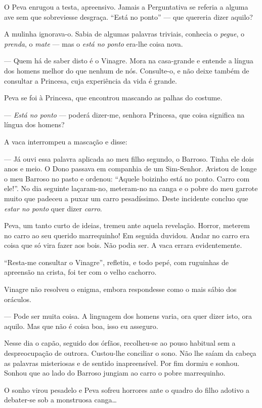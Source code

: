 O Peva enrugou a testa, apreensivo. Jamais a Perguntativa se referia a
alguma ave sem que sobreviesse desgraça. ``Está no ponto'' --- que
quereria dizer aquilo?

A mulinha ignorava-o. Sabia de algumas palavras triviais, conhecia o
\emph{pegue}, o \emph{prenda}, o \emph{mate} --- mas o \emph{está no
ponto} era-lhe coisa nova.

--- Quem há de saber disto é o Vinagre. Mora na casa-grande e entende a
língua dos homens melhor do que nenhum de nós. Consulte-o, e não deixe
também de consultar a Princesa, cuja experiência da vida é grande.

Peva se foi à Princesa, que encontrou mascando as palhas do costume.

--- \emph{Está no ponto} --- poderá dizer-me, senhora Princesa, que
coisa significa na língua dos homens?

A vaca interrompeu a mascação e disse:

--- Já ouvi essa palavra aplicada ao meu filho segundo, o Barroso. Tinha
ele dois anos e meio. O Dono passava em companhia de um Sim-Senhor.
Avistou de longe o meu Barroso no pasto e ordenou: ``Aquele boizinho
está no ponto. Carro com ele!''. No dia seguinte laçaram-no, meteram-no
na canga e o pobre do meu garrote muito que padeceu a puxar um carro
pesadíssimo. Deste incidente concluo que \emph{estar no ponto} quer
dizer \emph{carro}.

Peva, um tanto curto de ideias, tremeu ante aquela revelação. Horror,
meterem no carro ao seu querido marrequinho! Em seguida duvidou. Andar
no carro era coisa que só vira fazer aos bois. Não podia ser. A vaca
errara evidentemente.

``Resta-me consultar o Vinagre'', refletiu, e todo pepé, com ruguinhas
de apreensão na crista, foi ter com o velho cachorro.

Vinagre não resolveu o enigma, embora respondesse como o mais sábio dos
oráculos.

--- Pode ser muita coisa. A linguagem dos homens varia, ora quer dizer
isto, ora aquilo. Mas que não é coisa boa, isso eu asseguro.

Nesse dia o capão, seguido dos órfãos, recolheu-se ao pouso habitual sem
a despreocupação de outrora. Custou-lhe conciliar o sono. Não lhe saíam
da cabeça as palavras misteriosas e de sentido inapreensível. Por fim
dormiu e sonhou. Sonhou que ao lado do Barroso jungiam ao carro o pobre
marrequinho.

O sonho virou pesadelo e Peva sofreu horrores ante o quadro do filho
adotivo a debater-se sob a monstruosa canga\ldots{}

